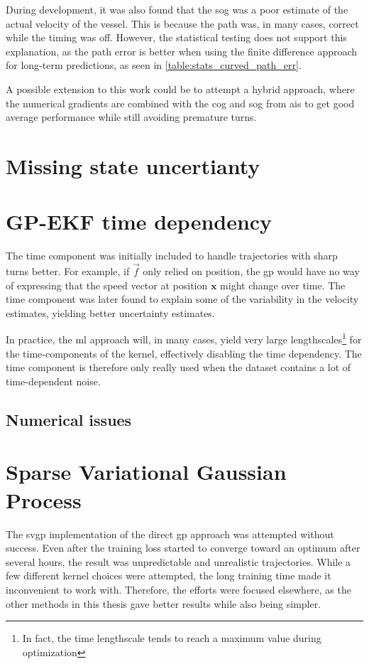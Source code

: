 During development, it was also found that the \acrshort{sog} was a poor estimate of the actual velocity of the vessel. This is because the path was, in many cases, correct while the timing was off. However, the statistical testing does not support this explanation, as the path error is better when using the finite difference approach for long-term predictions, as seen in \cref{table:stats_curved_path_err}.

A possible extension to this work could be to attempt a hybrid approach, where the numerical gradients are combined with the \acrshort{cog} and \acrshort{sog} from \acrshort{ais} to get good average performance while still avoiding premature turns. 

\section{Missing state uncertianty}

\section{GP-EKF time dependency}
The time component was initially included to handle trajectories with sharp turns better. For example, if $\vec{f}$ only relied on position, the \acrshort{gp} would have no way of expressing that the speed vector at position $\boldsymbol{x}$ might change over time. The time component was later found to explain some of the variability in the velocity estimates, yielding better uncertainty estimates.

In practice, the \acrshort{ml} approach will, in many cases, yield very large lengthscales\footnote{In fact, the time lengthscale tends to reach a maximum value during optimization} for the time-components of the kernel, effectively disabling the time dependency. The time component is therefore only really used when the dataset contains a lot of time-dependent noise.

\subsection{Numerical issues}



\section{Sparse Variational Gaussian Process}
The \acrshort{svgp} implementation of the direct \acrshort{gp} approach was attempted without success. Even after the training loss started to converge toward an optimum after several hours, the result was unpredictable and unrealistic trajectories. While a few different kernel choices were attempted, the long training time made it inconvenient to work with. Therefore, the efforts were focused elsewhere, as the other methods in this thesis gave better results while also being simpler. 

